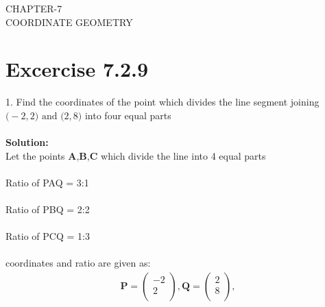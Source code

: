 \documentclass[12pt]{article}
\newcommand{\solution}{\noindent \textbf{Solution: }}
\newcommand{\myvec}[1]{\ensuremath{\begin{pmatrix}#1\end{pmatrix}}}
\let\vec\mathbf
\begin{document}
\begin{center}
\textbf\large{CHAPTER-7 \\ COORDINATE GEOMETRY}
\end{center}
\section*{Excercise 7.2.9}

1. Find the coordinates of the point which divides the line segment joining $\vec(-2,2) \text{ and } \vec(2,8)$ into four equal parts
\\
\\
\solution\\		
Let the points $\vec{A}$,$\vec{B}$,$\vec{C}$ which divide the line into 4 equal parts\\
\\
Ratio of PAQ = 3:1\\
\\
Ratio of PBQ = 2:2\\
\\
Ratio of PCQ = 1:3\\
\\
coordinates and ratio are given as:
\begin{align}
\vec{P}=\myvec{-2\\2\\},
\vec{Q}=\myvec{2\\8\\},
\end{align}
\end{document}
